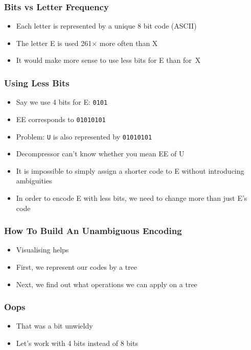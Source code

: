 \begin{frame}
  \frametitle{Bits vs Letter Frequency}
  \begin{itemize}
    \item Each letter is represented by a unique 8 bit code (ASCII)
    \item The letter E is used 261$\times$ more often than X
    \item It would make more sense to use less bits for E than for~X
  \end{itemize}
\end{frame}

\begin{frame}
  \frametitle{Using Less Bits}
  \begin{itemize}
    \item Say we use 4 bits for E: \texttt{0101}
    \item EE corresponds to \texttt{01010101}
    \item Problem: {\tt U} is also represented by \texttt{01010101}
    \item Decompressor can't know whether you mean EE of U
    \item It is impossible to simply assign a shorter code to E without introducing ambiguities
    \item In order to encode E with less bits, we need to change more than just E's code
  \end{itemize}
\end{frame}

\begin{frame}
  \frametitle{How To Build An Unambiguous Encoding}
  \begin{itemize}
    \item Visualising helps
    \item First, we represent our codes by a tree
    \item Next, we find out what operations we can apply on a tree
  \end{itemize}
\end{frame}



\begin{frame}
  \frametitle{Oops}
  \begin{itemize}
    \item That was a bit unwieldy
    \item Let's work with 4 bits instead of 8 bits
  \end{itemize}
\end{frame}

